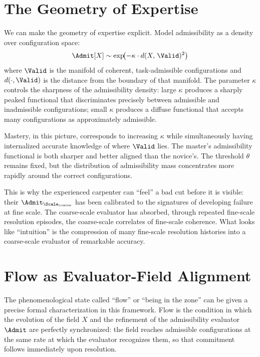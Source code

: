 \documentclass[11pt,oneside]{book}
\begin{document}
\section{The Geometry of Expertise}

We can make the geometry of expertise explicit. Model admissibility as a density over configuration space:
\begin{equation}
    \Admit[X] \sim \exp\!\bigl(-\kappa \cdot d(X,\, \Valid)^2\bigr)
\end{equation}
where $\Valid$ is the manifold of coherent, task-admissible configurations and $d(\cdot, \Valid)$ is the distance from the boundary of that manifold. The parameter $\kappa$ controls the sharpness of the admissibility density: large $\kappa$ produces a sharply peaked functional that discriminates precisely between admissible and inadmissible configurations; small $\kappa$ produces a diffuse functional that accepts many configurations as approximately admissible.

Mastery, in this picture, corresponds to increasing $\kappa$ while simultaneously having internalized accurate knowledge of where $\Valid$ lies. The master's admissibility functional is both sharper and better aligned than the novice's. The threshold $\theta$ remains fixed, but the distribution of admissibility mass concentrates more rapidly around the correct configurations.

This is why the experienced carpenter can ``feel'' a bad cut before it is visible: their $\Admit_{\Scale_{\mathrm{coarse}}}$ has been calibrated to the signatures of developing failure at fine scale. The coarse-scale evaluator has absorbed, through repeated fine-scale resolution episodes, the coarse-scale correlates of fine-scale coherence. What looks like ``intuition'' is the compression of many fine-scale resolution histories into a coarse-scale evaluator of remarkable accuracy.

\section{Flow as Evaluator-Field Alignment}

The phenomenological state called ``flow'' or ``being in the zone'' can be given a precise formal characterization in this framework. Flow is the condition in which the evolution of the field $X$ and the refinement of the admissibility evaluator $\Admit$ are perfectly synchronized: the field reaches admissible configurations at the same rate at which the evaluator recognizes them, so that commitment follows immediately upon resolution.
\end{document}
